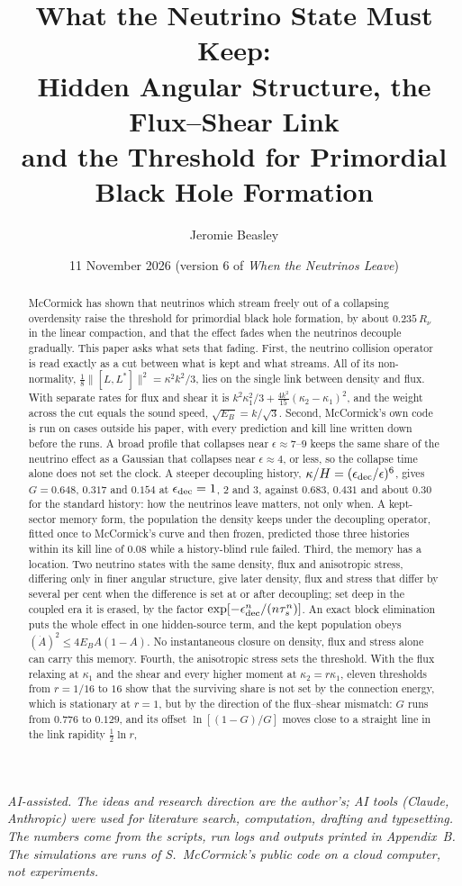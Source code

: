 \documentclass[11pt]{article}
\title{What the Neutrino State Must Keep:\\ Hidden Angular Structure, the Flux--Shear Link\\ and the Threshold for Primordial Black Hole Formation}
\author{Jeromie Beasley}
\date{11 November 2026 \quad (version 6 of \emph{When the Neutrinos Leave})}
\begin{document}
\maketitle

\noindent\emph{AI-assisted. The ideas and research direction are the author's; AI tools (Claude, Anthropic) were used for literature search, computation, drafting and typesetting. The numbers come from the scripts, run logs and outputs printed in Appendix~B. The simulations are runs of S.~McCormick's public code on a cloud computer, not experiments.}

\begin{abstract}
McCormick has shown that neutrinos which stream freely out of a collapsing overdensity raise the threshold for primordial black hole formation, by about $0.235\,R_\nu$ in the linear compaction, and that the effect fades when the neutrinos decouple gradually. This paper asks what sets that fading. First, the neutrino collision operator is read exactly as a cut between what is kept and what streams. All of its non-normality, $\tfrac18\lVert[L,L^\ast]\rVert^2=\kappa^2k^2/3$, lies on the single link between density and flux. With separate rates for flux and shear it is $k^2\kappa_1^2/3+\tfrac{4k^2}{15}(\kappa_2-\kappa_1)^2$, and the weight across the cut equals the sound speed, $\sqrt{E_B}=k/\sqrt3$. Second, McCormick's own code is run on cases outside his paper, with every prediction and kill line written down before the runs. A broad profile that collapses near $\epsilon\approx7$--$9$ keeps the same share of the neutrino effect as a Gaussian that collapses near $\epsilon\approx4$, or less, so the collapse time alone does not set the clock. A steeper decoupling history, $\kappa/H=(\epsilon_{\rm dec}/\epsilon)^6$, gives $G=0.648$, $0.317$ and $0.154$ at $\epsilon_{\rm dec}=1$, $2$ and $3$, against $0.683$, $0.431$ and about $0.30$ for the standard history: how the neutrinos leave matters, not only when. A kept-sector memory form, the population the density keeps under the decoupling operator, fitted once to McCormick's curve and then frozen, predicted those three histories within its kill line of $0.08$ while a history-blind rule failed. Third, the memory has a location. Two neutrino states with the same density, flux and anisotropic stress, differing only in finer angular structure, give later density, flux and stress that differ by several per cent when the difference is set at or after decoupling; set deep in the coupled era it is erased, by the factor $\exp[-\epsilon_{\rm dec}^n/(n\tau_s^n)]$. An exact block elimination puts the whole effect in one hidden-source term, and the kept population obeys $(\dot A)^2\le4E_BA(1-A)$. No instantaneous closure on density, flux and stress alone can carry this memory. Fourth, the anisotropic stress sets the threshold. With the flux relaxing at $\kappa_1$ and the shear and every higher moment at $\kappa_2=r\kappa_1$, eleven thresholds from $r=1/16$ to $16$ show that the surviving share is not set by the connection energy, which is stationary at $r=1$, but by the direction of the flux--shear mismatch: $G$ runs from $0.776$ to $0.129$, and its offset $\ln[(1-G)/G]$ moves close to a straight line in the link rapidity $\tfrac12\ln r$, 
\end{abstract}
\end{document}
